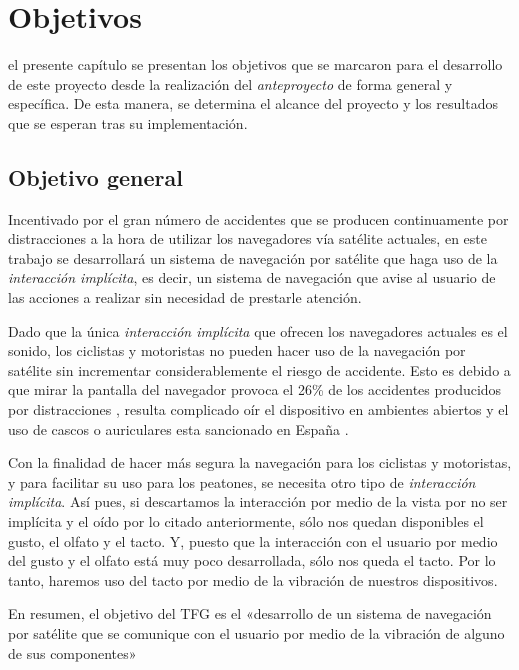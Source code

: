 \chapter{Objetivos}
\label{chap:objetivos}

 el presente capítulo se presentan los objetivos que se marcaron para el desarrollo de
este proyecto desde la realización del \emph{anteproyecto} de forma general y específica. De esta
manera, se determina el alcance del proyecto y los resultados que se esperan tras su implementación.

\section{Objetivo general}

Incentivado por el gran número de accidentes que se producen continuamente por distracciones a la
hora de utilizar los navegadores vía satélite actuales, en este trabajo se desarrollará un sistema
de navegación por satélite que haga uso de la \emph{interacción implícita}, es decir, un sistema de
navegación que avise al usuario de las acciones a realizar sin necesidad de prestarle atención.

Dado que la única \emph{interacción implícita} que ofrecen los navegadores actuales es el sonido,
los ciclistas y motoristas no pueden hacer uso de la navegación por satélite sin incrementar
considerablemente el riesgo de accidente. Esto es debido a que mirar la pantalla del navegador
provoca el 26\% de los accidentes producidos por distracciones \cite{Allianz14}, resulta complicado
oír el dispositivo en ambientes abiertos y el uso de cascos o auriculares esta sancionado en
España \cite{Serrano14}.

Con la finalidad de hacer más segura la navegación para los ciclistas y motoristas, y para facilitar
su uso para los peatones, se necesita otro tipo de \emph{interacción implícita}. Así pues, si
descartamos la interacción por medio de la vista por no ser implícita y el oído por lo citado
anteriormente, sólo nos quedan disponibles el gusto, el olfato y el tacto. Y, puesto que la
interacción con el usuario por medio del gusto y el olfato está muy poco desarrollada, sólo nos
queda el tacto. Por lo tanto, haremos uso del tacto por medio de la vibración de nuestros
dispositivos.

En resumen, el objetivo del \acf{TFG} es el «desarrollo de un sistema de navegación
  por satélite que se comunique con el usuario por medio de la vibración de alguno de sus
  componentes»

